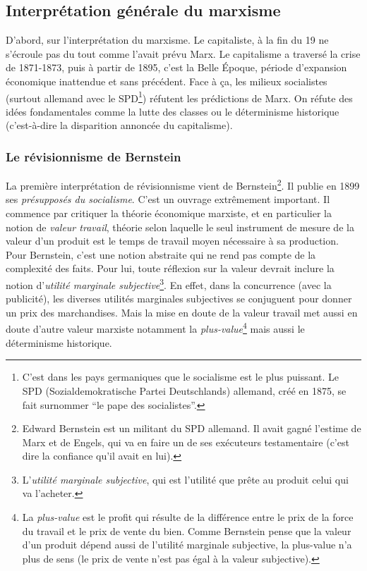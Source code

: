 \documentclass[12pt]{report}
\begin{document}
\subsection{Interprétation générale du marxisme}

D'abord, sur l'interprétation du marxisme.
Le capitaliste, à la fin du 19 ne s’écroule pas du tout comme l’avait prévu Marx. 
Le capitalisme a traversé la crise de 1871-1873, puis à partir de 1895, c'est la Belle Époque, période d'expansion économique inattendue et sans précédent.
Face à ça, les milieux socialistes (surtout allemand avec le SPD\footnote{C'est dans les pays germaniques que le socialisme est le plus puissant. Le SPD (Sozialdemokratische Partei Deutschlands) allemand, créé en 1875, se fait surnommer \enquote{le pape des socialistes}.}) réfutent les prédictions de Marx. 
On réfute des idées fondamentales comme la lutte des classes ou le déterminisme historique (c’est-à-dire la disparition annoncée du capitalisme).

\subsubsection{Le révisionnisme de Bernstein}

La première interprétation de révisionnisme vient de Bernstein\footnote{Edward Bernstein est un militant du SPD allemand.  Il avait gagné l'estime de Marx et de Engels, qui va en faire un de ses exécuteurs testamentaire (c'est dire la confiance qu'il avait en lui).}.
Il publie en 1899 ses \emph{présupposés du socialisme}. C'est un ouvrage extrêmement important.
Il commence par critiquer la théorie économique marxiste, et en particulier la notion de \emph{valeur travail}, théorie selon laquelle le seul instrument de mesure de la valeur d'un produit est le temps de travail moyen nécessaire à sa production.
Pour Bernstein, c'est une notion abstraite qui ne rend pas compte de la complexité des faits. 
Pour lui, toute réflexion sur la valeur devrait inclure la notion d'\emph{utilité marginale subjective}\footnote{L'\emph{utilité marginale subjective}, qui est l'utilité que prête au produit celui qui va l'acheter.}.
En effet, dans la concurrence (avec la publicité), les diverses utilités marginales subjectives se conjuguent pour donner un prix des marchandises. 
Mais la mise en doute de la valeur travail met aussi en doute d’autre valeur marxiste notamment la \emph{plus-value}\footnote{La \emph{plus-value} est le profit qui résulte de la différence entre le prix de la force du travail et le prix de vente du bien. Comme Bernstein pense que la valeur d'un produit dépend aussi de l'utilité marginale subjective, la plus-value n'a plus de sens (le prix de vente n'est pas égal à la valeur subjective).} mais aussi le déterminisme historique.
\end{document}
